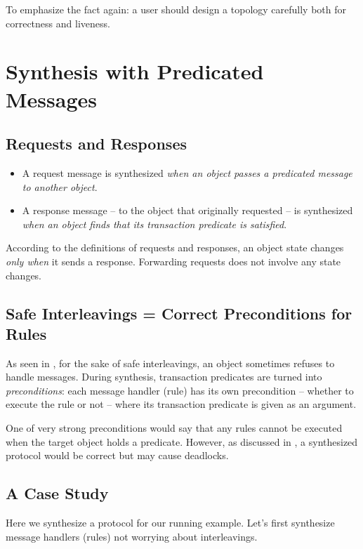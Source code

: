 \documentclass[format=manuscript]{acmart}
\begin{document}
To emphasize the fact again: a user should design a topology carefully both for
correctness and liveness.

\section{Synthesis with Predicated Messages}

\subsection{Requests and Responses}

\begin{itemize}
\item A request message is synthesized \emph{when an object passes a predicated
  message to another object}.
\item A response message -- to the object that originally requested -- is
  synthesized \emph{when an object finds that its transaction predicate is
    satisfied}.
\end{itemize}

According to the definitions of requests and responses, an object state changes
\emph{only when} it sends a response. Forwarding requests does not involve any
state changes.

\subsection{Safe Interleavings = Correct Preconditions for Rules}

As seen in , for the sake of safe interleavings, an object
sometimes refuses to handle messages. During synthesis, transaction predicates
are turned into \emph{preconditions}: each message handler (rule) has its own
precondition -- whether to execute the rule or not -- where its transaction
predicate is given as an argument.

One of very strong preconditions would say that any rules cannot be executed
when the target object holds a predicate. However, as discussed in
, a synthesized protocol would be correct but may cause
deadlocks.

\subsection{A Case Study}

Here we synthesize a protocol for our running example. Let's first synthesize
message handlers (rules) not worrying about interleavings.
\end{document}
